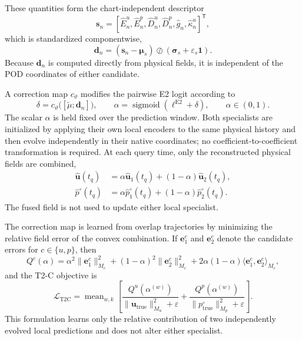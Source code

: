 These quantities form the chart-independent descriptor
\begin{equation}
  \boldsymbol{s}_n
  =
  [
    \widehat E_n^u,
    \widehat E_n^p,
    \widehat D_n^u,
    \widehat D_n^p,
    \widehat g_n,
    \widehat\kappa_n^u
  ]^{\mathsf T},
  \label{eq:dimensionless_physical_statistics}
\end{equation}
which is standardized componentwise,
\begin{equation}
  \boldsymbol{d}_n
  =
  (\boldsymbol{s}_n-\boldsymbol{\mu}_s)
  \oslash
  (\boldsymbol{\sigma}_s+\varepsilon_s\boldsymbol{1}).
  \label{eq:standardized_physical_descriptors}
\end{equation}
Because $\boldsymbol{d}_n$ is computed directly from physical fields, it is
independent of the POD coordinates of either candidate.

A correction map $c_{\vartheta}$ modifies the pairwise E2 logit according to
\begin{equation}
  \delta
  =
  c_{\vartheta}
  \bigl([\widetilde\mu;\boldsymbol{d}_n]\bigr),
  \qquad
  \alpha
  =
  \operatorname{sigmoid}(\ell^{\mathrm{E2}}+\delta),
  \qquad
  \alpha\in(0,1).
  \label{eq:t2c_convex_gate}
\end{equation}
The scalar $\alpha$ is held fixed over the prediction window.  Both
specialists are initialized by applying their own local encoders to the same
physical history and then evolve independently in their native coordinates;
no coefficient-to-coefficient transformation is required.  At each query
time, only the reconstructed physical fields are combined,
\begin{align}
  \widehat{\boldsymbol{u}}(t_q)
  &=
  \alpha\widehat{\boldsymbol{u}}_1(t_q)
  +(1-\alpha)\widehat{\boldsymbol{u}}_2(t_q),
  \label{eq:field_fusion}\\
  \widehat p^{\circ}(t_q)
  &=
  \alpha\widehat p^{\circ}_1(t_q)
  +(1-\alpha)\widehat p^{\circ}_2(t_q).
  \label{eq:pressure_field_fusion}
\end{align}
The fused field is not used to update either local specialist.

The correction map is learned from overlap trajectories by minimizing the
relative field error of the convex combination.  If
$\boldsymbol{e}_1^c$ and $\boldsymbol{e}_2^c$ denote the candidate errors for
$c\in\{u,p\}$, then
\begin{equation}
  Q^c(\alpha)
  =
  \alpha^2\|\boldsymbol{e}_1^c\|_{M_c}^{2}
  +(1-\alpha)^2\|\boldsymbol{e}_2^c\|_{M_c}^{2}
  +2\alpha(1-\alpha)
   \langle\boldsymbol{e}_1^c,\boldsymbol{e}_2^c\rangle_{M_c},
  \label{eq:t2c_quadratic_error}
\end{equation}
and the T2-C objective is
\begin{equation}
  \mathcal{L}_{\mathrm{T2C}}
  =
  \operatorname{mean}_{w,k}
  \left[
    \frac{Q^u(\alpha^{(w)})}
         {\|\boldsymbol{u}_{\mathrm{true}}\|_{M_u}^{2}+\varepsilon}
    +
    \frac{Q^p(\alpha^{(w)})}
         {\|p^{\circ}_{\mathrm{true}}\|_{M_p}^{2}+\varepsilon}
  \right].
  \label{eq:t2c_training_loss}
\end{equation}
This formulation learns only the relative contribution of two independently
evolved local predictions and does not alter either specialist.

